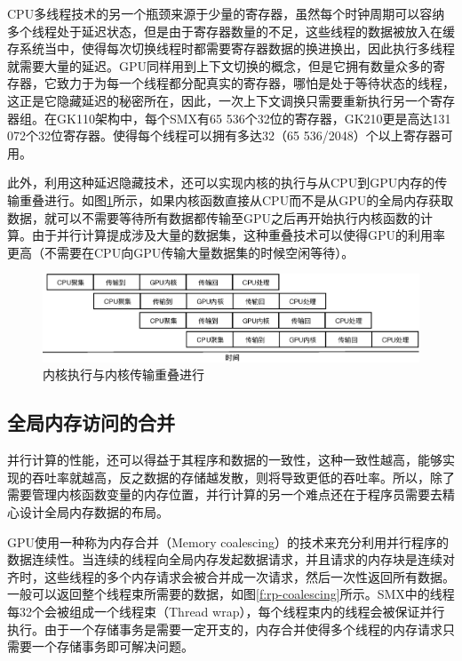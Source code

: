 CPU多线程技术的另一个瓶颈来源于少量的寄存器，虽然每个时钟周期可以容纳多个线程处于延迟状态，但是由于寄存器数量的不足，这些线程的数据被放入在缓存系统当中，使得每次切换线程时都需要寄存器数据的换进换出，因此执行多线程就需要大量的延迟。GPU同样用到上下文切换的概念，但是它拥有数量众多的寄存器，它致力于为每一个线程都分配真实的寄存器，哪怕是处于等待状态的线程，这正是它隐藏延迟的秘密所在，因此，一次上下文调换只需要重新执行另一个寄存器组。在GK110架构中，每个SMX有65 536个32位的寄存器，GK210更是高达131 072个32位寄存器。使得每个线程可以拥有多达32（65 536/2048）个以上寄存器可用。

此外，利用这种延迟隐藏技术，还可以实现内核的执行与从CPU到GPU内存的传输重叠进行。如图\ref{f:rp-streaming}所示，如果内核函数直接从CPU而不是从GPU的全局内存获取数据，就可以不需要等待所有数据都传输至GPU之后再开始执行内核函数的计算。由于并行计算提成涉及大量的数据集，这种重叠技术可以使得GPU的利用率更高（不需要在CPU向GPU传输大量数据集的时候空闲等待）。

\begin{figure}
	\includegraphics[width=1.\textwidth]{figures/rp/streaming}
	\caption{内核执行与内核传输重叠进行}
	\label{f:rp-streaming}
\end{figure}




\subsection{全局内存访问的合并}
并行计算的性能，还可以得益于其程序和数据的一致性，这种一致性越高，能够实现的吞吐率就越高，反之数据的存储越发散，则将导致更低的吞吐率。所以，除了需要管理内核函数变量的内存位置，并行计算的另一个难点还在于程序员需要去精心设计全局内存数据的布局。

GPU使用一种称为内存合并（Memory coalescing）的技术来充分利用并行程序的数据连续性。当连续的线程向全局内存发起数据请求，并且请求的内存块是连续对齐时，这些线程的多个内存请求会被合并成一次请求，然后一次性返回所有数据。一般可以返回整个线程束所需要的数据，如图\ref{f:rp-coalescing}所示。SMX中的线程每32个会被组成一个线程束（Thread wrap），每个线程束内的线程会被保证并行执行。由于一个存储事务是需要一定开支的，内存合并使得多个线程的内存请求只需要一个存储事务即可解决问题。

